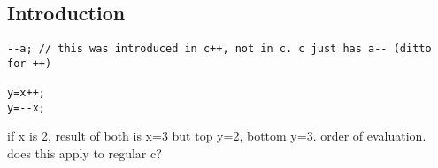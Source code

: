 
\subsection{Introduction}

\begin{verbatim}
--a; // this was introduced in c++, not in c. c just has a-- (ditto for ++)

y=x++;
y=--x;
\end{verbatim}
if x is 2, result of both is x=3 but top y=2, bottom y=3. order of evaluation.
does this apply to regular c?

